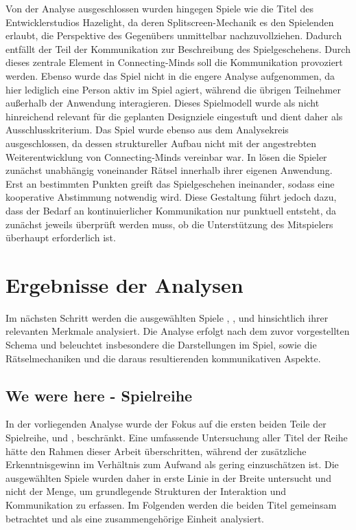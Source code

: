 Von der Analyse ausgeschlossen wurden hingegen Spiele wie die Titel des Entwicklerstudios Hazelight, da deren Splitscreen-Mechanik es den Spielenden erlaubt, die Perspektive des Gegenübers unmittelbar nachzuvollziehen. Dadurch entfällt der Teil der Kommunikation zur Beschreibung des Spielgeschehens. Durch dieses zentrale Element in Connecting-Minds soll die Kommunikation provoziert werden. Ebenso wurde das Spiel  nicht in die engere Analyse aufgenommen, da hier lediglich eine Person aktiv im Spiel agiert, während die übrigen Teilnehmer außerhalb der Anwendung interagieren. Dieses Spielmodell wurde als nicht hinreichend relevant für die geplanten Designziele eingestuft und dient daher als Ausschlusskriterium. Das Spiel  wurde ebenso aus dem Analysekreis ausgeschlossen, da dessen struktureller Aufbau nicht mit der angestrebten Weiterentwicklung von Connecting-Minds vereinbar war. In  lösen die Spieler zunächst unabhängig voneinander Rätsel innerhalb ihrer eigenen Anwendung. Erst an bestimmten Punkten greift das Spielgeschehen ineinander, sodass eine kooperative Abstimmung notwendig wird. Diese Gestaltung führt jedoch dazu, dass der Bedarf an kontinuierlicher Kommunikation nur punktuell entsteht, da zunächst jeweils überprüft werden muss, ob die Unterstützung des Mitspielers überhaupt erforderlich ist.

\section{Ergebnisse der Analysen}

Im nächsten Schritt werden die ausgewählten Spiele , ,  und  hinsichtlich ihrer relevanten Merkmale analysiert. Die Analyse erfolgt nach dem zuvor vorgestellten Schema und beleuchtet insbesondere die Darstellungen im Spiel, sowie die Rätselmechaniken und die daraus resultierenden kommunikativen Aspekte.

\subsection{We were here - Spielreihe}
In der vorliegenden Analyse wurde der Fokus auf die ersten beiden Teile der Spielreihe,  und , beschränkt. Eine umfassende Untersuchung aller Titel der Reihe hätte den Rahmen dieser Arbeit überschritten, während der zusätzliche Erkenntnisgewinn im Verhältnis zum Aufwand als gering einzuschätzen ist. Die ausgewählten Spiele wurden daher in erste Linie in der Breite untersucht und nicht der Menge, um grundlegende Strukturen der Interaktion und Kommunikation zu erfassen. Im Folgenden werden die beiden Titel gemeinsam betrachtet und als eine zusammengehörige Einheit analysiert.


